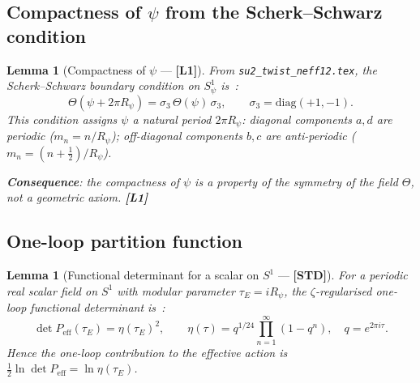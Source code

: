 \documentclass[12pt,a4paper]{article}
\newtheorem{lemma}[theorem]{Lemma}
\theoremstyle{definition}\newtheorem{definition}[theorem]{Definition}
\theoremstyle{remark}\newtheorem{remark}[theorem]{Remark}
\newcommand{\Lo}{\textbf{[L1]}}
\newcommand{\STD}{\textbf{[STD]}}
\begin{document}
\subsection{Compactness of $\psi$ from the Scherk--Schwarz condition}

\begin{lemma}[Compactness of $\psi$ — \Lo]
\label{lem:SS}
From \textup{\texttt{su2\_twist\_neff12.tex}}, the Scherk--Schwarz
boundary condition on $S^1_\psi$ is~\cite{su2_twist}:
\[
  \Theta(\psi + 2\pi R_\psi) = \sigma_3\,\Theta(\psi)\,\sigma_3,
  \qquad \sigma_3 = \mathrm{diag}(+1,-1).
\]
This condition assigns $\psi$ a natural period $2\pi R_\psi$:
diagonal components $a,d$ are periodic ($m_n = n/R_\psi$);
off-diagonal components $b,c$ are anti-periodic
($m_n = (n+\tfrac{1}{2})/R_\psi$).

\textbf{Consequence}: the compactness of $\psi$ is a property of
the symmetry of the field $\Theta$, not a geometric axiom. \Lo
\end{lemma}

\subsection{One-loop partition function}

\begin{lemma}[Functional determinant for a scalar on $S^1$ — \STD]
\label{lem:detP}
For a periodic real scalar field on $S^1$ with modular parameter
$\tau_E = iR_\psi$, the $\zeta$-regularised one-loop functional
determinant is~\cite[§7.2]{polchinski_v1}:
\[
  \det P_{\mathrm{eff}}(\tau_E) = \eta(\tau_E)^2,
  \qquad
  \eta(\tau) = q^{1/24}\prod_{n=1}^{\infty}(1-q^n),
  \quad q = e^{2\pi i\tau}.
\]
Hence the one-loop contribution to the effective action is
$\frac{1}{2}\ln\det P_{\mathrm{eff}} = \ln\eta(\tau_E)$.
\end{lemma}
\end{document}
